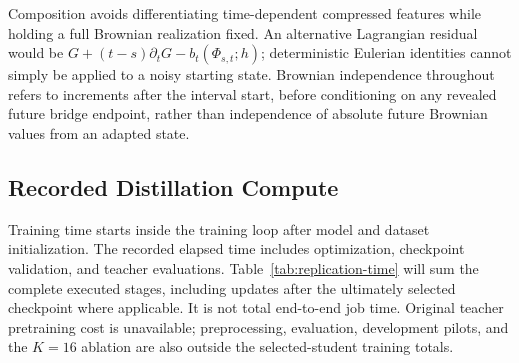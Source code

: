 Composition avoids differentiating time-dependent compressed features while holding a full Brownian realization fixed. An alternative Lagrangian residual would be $G+(t-s)\partial_tG-b_t(\Phi_{s,t};h)$; deterministic Eulerian identities cannot simply be applied to a noisy starting state. Brownian independence throughout refers to increments after the interval start, before conditioning on any revealed future bridge endpoint, rather than independence of absolute future Brownian values from an adapted state.

\subsection{Recorded Distillation Compute}\label{app:compute}
\begin{table}[t]
\caption{Recorded training-and-validation time for each complete two-stage student replication, excluding model/data initialization and original teacher pretraining.}
\label{tab:replication-time}
\centering
{}
\end{table}
Training time starts inside the training loop after model and dataset initialization. The recorded elapsed time includes optimization, checkpoint validation, and teacher evaluations. Table~\ref{tab:replication-time} will sum the complete executed stages, including updates after the ultimately selected checkpoint where applicable. It is not total end-to-end job time. Original teacher pretraining cost is unavailable; preprocessing, evaluation, development pilots, and the $K=16$ ablation are also outside the selected-student training totals.

